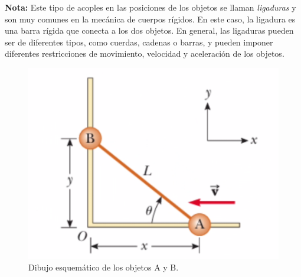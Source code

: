 \documentclass{replab}
\begin{document}
	\textbf{Nota:} Este tipo de acoples en las posiciones de los objetos se llaman \textit{ligaduras} y son muy comunes en la mecánica de cuerpos rígidos. En este caso, la ligadura es una barra rígida que conecta a los dos objetos. En general, las ligaduras pueden ser de diferentes tipos, como cuerdas, cadenas o barras, y pueden imponer diferentes restricciones de movimiento, velocidad y aceleración de los objetos.
	
	\begin{figure}[htbp]
		\centering
		\includegraphics[width=.4\columnwidth]{imagenes/ligaduras.png}
		\caption{Dibujo esquemático de los objetos A y B.}
		\label{fig:ligaduras}
	\end{figure}

	\newpage
	\printbibliography[heading=bibintoc]
	
\end{document}
